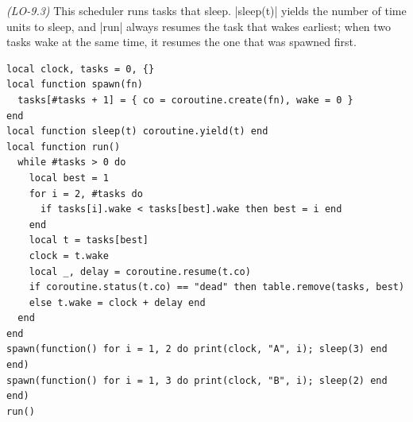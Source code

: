 \documentclass[11pt,addpoints]{exam}
\begin{document}
\begin{questions}
\question \textit{(LO-9.3)} This scheduler runs tasks that sleep. \code|sleep(t)| yields the
number of time units to sleep, and \code|run| always resumes the task that wakes earliest; when two
tasks wake at the same time, it resumes the one that was spawned first.

\begin{lstlisting}
local clock, tasks = 0, {}
local function spawn(fn)
  tasks[#tasks + 1] = { co = coroutine.create(fn), wake = 0 }
end
local function sleep(t) coroutine.yield(t) end
local function run()
  while #tasks > 0 do
    local best = 1
    for i = 2, #tasks do
      if tasks[i].wake < tasks[best].wake then best = i end
    end
    local t = tasks[best]
    clock = t.wake
    local _, delay = coroutine.resume(t.co)
    if coroutine.status(t.co) == "dead" then table.remove(tasks, best)
    else t.wake = clock + delay end
  end
end
spawn(function() for i = 1, 2 do print(clock, "A", i); sleep(3) end end)
spawn(function() for i = 1, 3 do print(clock, "B", i); sleep(2) end end)
run()
\end{lstlisting}

\end{questions}
\end{document}
